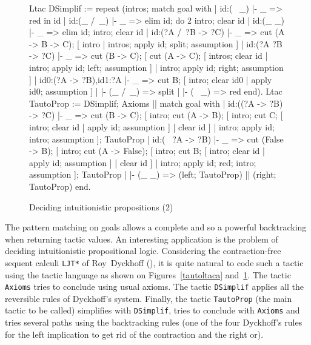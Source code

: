 \begin{coq_example}
\begin{figure}
\begin{centerframe}
\begin{coq_example}
Ltac DSimplif :=
  repeat
   (intros;
    match goal with
     | id:(~ _) |- _ => red in id
     | id:(_ /\ _) |- _ =>
         elim id; do 2 intro; clear id
     | id:(_ \/ _) |- _ =>
         elim id; intro; clear id
     | id:(?A /\ ?B -> ?C) |- _ =>
         cut (A -> B -> C);
          [ intro | intros; apply id; split; assumption ]
     | id:(?A \/ ?B -> ?C) |- _ =>
         cut (B -> C);
          [ cut (A -> C);
             [ intros; clear id
             | intro; apply id; left; assumption ]
          | intro; apply id; right; assumption ]
     | id0:(?A -> ?B),id1:?A |- _ =>
         cut B; [ intro; clear id0 | apply id0; assumption ]
     | |- (_ /\ _) => split
     | |- (~ _) => red
     end).
Ltac TautoProp :=
  DSimplif;
   Axioms ||
     match goal with
     | id:((?A -> ?B) -> ?C) |- _ =>
          cut (B -> C);
          [ intro; cut (A -> B);
             [ intro; cut C;
                [ intro; clear id | apply id; assumption ]
             | clear id ]
          | intro; apply id; intro; assumption ]; TautoProp
     | id:(~ ?A -> ?B) |- _ =>
         cut (False -> B);
          [ intro; cut (A -> False);
             [ intro; cut B;
                [ intro; clear id | apply id; assumption ]
             | clear id ]
          | intro; apply id; red; intro; assumption ]; TautoProp
     | |- (_ \/ _) => (left; TautoProp) || (right; TautoProp)
     end.
\end{coq_example}
\end{centerframe}
\caption{Deciding intuitionistic propositions (2)}
\label{tautoltacb}
\end{figure}

The pattern matching on goals allows a complete and so a powerful
backtracking when returning tactic values. An interesting application
is the problem of deciding intuitionistic propositional logic.
Considering the contraction-free sequent calculi {\tt LJT*} of
Roy~Dyckhoff (\cite{Dyc92}), it is quite natural to code such a tactic
using the tactic language as shown on Figures~\ref{tautoltaca}
and~\ref{tautoltacb}. The tactic {\tt Axioms} tries to conclude using
usual axioms. The tactic {\tt DSimplif} applies all the reversible
rules of Dyckhoff's system. Finally, the tactic {\tt TautoProp} (the
main tactic to be called) simplifies with {\tt DSimplif}, tries to
conclude with {\tt Axioms} and tries several paths using the
backtracking rules (one of the four Dyckhoff's rules for the left
implication to get rid of the contraction and the right or).


\end{coq_example}
